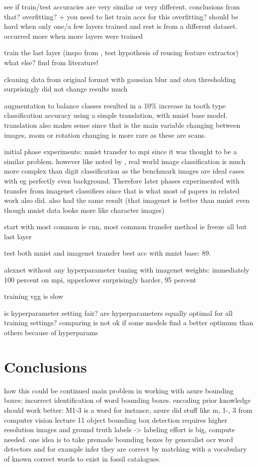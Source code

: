 \documentclass{article}
\begin{document}
see if train/test accuracies are very similar or very different. conclusions from that? overfitting? + you need to list train accs for this
overfitting? should be hard when only one/a few layers trained and rest is from a different dataset.
occurred more when more layers were trained

train the last layer (inspo from \cite{tibetan_ocr}, test hypothesis of reusing feature extractor)
what else? find from literature!

cleaning data from original format with gaussian blur and otsu thresholding surprisingly did not 
change results much 

augmentation to balance classes resulted in a 10\% increase in tooth type classification accuracy 
using a simple translation, with mnist base model. translation also makes sense since that is the main variable changing 
between images, zoom or rotation changing is more rare as these are scans.

initial phase experiments: mnist transfer to mpi since it was thought to be a similar problem. 
however like noted by \cite{alexnet}, real world image classification is much more complex than digit classification 
as the benchmark images are ideal cases with eg perfectly even background. Therefore later phases 
experimented with transfer from imagenet classifiers since that is what most of papers in related work also did.
also \cite{8goelGujarati2023} had the same result (that imagenet is better than mnist even though mnist data looks more like character images)

start with most common ie cnn, most common transfer method ie freeze all but last layer 

test both mnist and imagenet transfer 
best acc with mnist base: 89.

alexnet without any hyperparameter tuning with imagenet weights: immediately 100 percent on mpi,
upperlower surprisingly harder, 95 percent

training vgg is slow

is hyperparameter setting fair? are hyperparameters equally optimal for all training settings? comparing is not ok if some models find a better optimum than others because of hyperparams

\section{Conclusions}

how this could be continued
main problem in working with azure bounding boxes: incorrect identification of word bounding boxes.
encoding prior knowledge should work better: M1-3 is a word for instance, azure did stuff like m, 1-, 3
from computer vision lecture 11 \cite{ruotsalainen2024}
object bounding box detection requires higher resolution images and ground truth labels -> labeling effort is 
big, compute needed. one idea is to take premade bounding boxes by generalist ocr word detectors and for example
infer they are correct by matching with a vocabulary of known correct words to exist in fossil catalogues.
\end{document}
